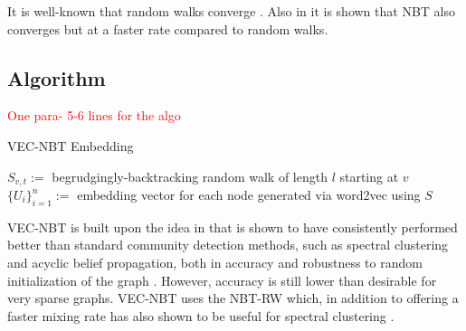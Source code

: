 \documentclass{article} %
\begin{document}
It is well-known that random walks converge \cite{Lovasz}. Also in \cite{NBT-Ihara,Alon} it is shown that NBT also converges but at a faster rate compared to random walks. 

\subsection{Algorithm}
\textcolor{red}{One para- 5-6 lines for the algo}
%

\begin{algorithm}
    \caption{VEC-NBT Embedding}
        {$S_{v,t} := $ begrudgingly-backtracking random walk of length $l$ starting at $v$}
    $\{U_i\}_{i=1}^{n} := $ embedding vector for each node generated via word2vec using $S$\\
\end{algorithm}

VEC-NBT is built upon the idea in \cite{NodeEmbed} that is shown to have consistently performed better than standard community detection methods, such as spectral clustering and acyclic belief propagation, both in accuracy and robustness to random initialization of the graph \cite{NodeEmbed}. However, accuracy is still lower than desirable for very sparse graphs. VEC-NBT uses the NBT-RW which, in addition to offering a faster mixing rate \cite{Alon} has also shown to be useful for spectral clustering \cite{Redemption}.
\end{document}

